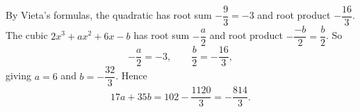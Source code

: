 By Vieta's formulas, the quadratic has root sum $-\dfrac{9}{3}=-3$ and root product $-\dfrac{16}{3}$. The cubic $2x^3+ax^2+6x-b$ has root sum $-\dfrac {a}{2}$ and root product $-\dfrac{-b}{2}=\dfrac {b}{2}$. So
\[-\dfrac {a}{2}=-3,\qquad\dfrac {b}{2}=-\dfrac{16}{3},\]
giving $a=6$ and $b=-\dfrac{32}{3}$. Hence
\[17a+35b=102-\dfrac{1120}{3}=\boxed{-\dfrac{814}{3}}.\]
